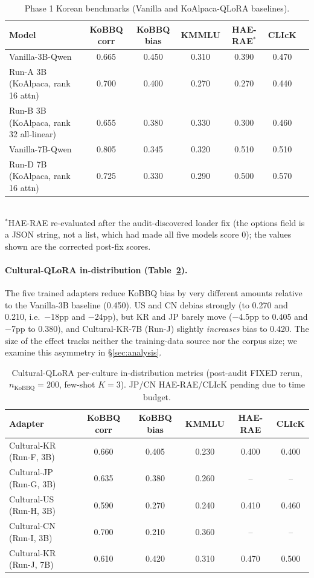 \documentclass{article}
\begin{document}
\begin{table}[t]
\centering
\small
\caption{Phase 1 Korean benchmarks (Vanilla and KoAlpaca-QLoRA baselines).}
\label{tab:baselines}
\begin{tabular}{lcccccc}
\toprule
Model & KoBBQ corr & KoBBQ bias & KMMLU & HAE-RAE$^*$ & CLIcK \\
\midrule
Vanilla-3B-Qwen & 0.665 & 0.450 & 0.310 & 0.390 & 0.470 \\
Run-A 3B (KoAlpaca, rank 16 attn) & 0.700 & 0.400 & 0.270 & 0.270 & 0.440 \\
Run-B 3B (KoAlpaca, rank 32 all-linear) & 0.655 & 0.380 & 0.330 & 0.300 & 0.460 \\
Vanilla-7B-Qwen & 0.805 & 0.345 & 0.320 & 0.510 & 0.510 \\
Run-D 7B (KoAlpaca, rank 16 attn) & 0.725 & 0.330 & 0.290 & 0.500 & 0.570 \\
\bottomrule
\end{tabular}
\\[2pt]
\footnotesize $^*$HAE-RAE re-evaluated after the audit-discovered loader fix (the options field is a JSON string, not a list, which had made all five models score 0); the values shown are the corrected post-fix scores.
\end{table}

\paragraph{Cultural-QLoRA in-distribution (Table~\ref{tab:cultural}).}
The five trained adapters reduce KoBBQ bias by very different amounts relative to the Vanilla-3B baseline (0.450). US and CN debias strongly (to 0.270 and 0.210, i.e.\ $-$18pp and $-$24pp), but KR and JP barely move ($-$4.5pp to 0.405 and $-$7pp to 0.380), and Cultural-KR-7B (Run-J) slightly \emph{increases} bias to 0.420. The size of the effect tracks neither the training-data source nor the corpus size; we examine this asymmetry in \S\ref{sec:analysis}.

\begin{table}[t]
\centering
\small
\caption{Cultural-QLoRA per-culture in-distribution metrics (post-audit FIXED rerun, $n_{\text{KoBBQ}}=200$, few-shot $K=3$). JP/CN HAE-RAE/CLIcK pending due to time budget.}
\label{tab:cultural}
\begin{tabular}{lccccc}
\toprule
Adapter & KoBBQ corr & KoBBQ bias & KMMLU & HAE-RAE & CLIcK \\
\midrule
Cultural-KR (Run-F, 3B) & 0.660 & 0.405 & 0.230 & 0.400 & 0.400 \\
Cultural-JP (Run-G, 3B) & 0.635 & 0.380 & 0.260 & -- & -- \\
Cultural-US (Run-H, 3B) & 0.590 & 0.270 & 0.240 & 0.410 & 0.460 \\
Cultural-CN (Run-I, 3B) & 0.700 & 0.210 & 0.360 & -- & -- \\
Cultural-KR (Run-J, 7B) & 0.610 & 0.420 & 0.310 & 0.470 & 0.500 \\
\bottomrule
\end{tabular}
\end{table}
\end{document}
